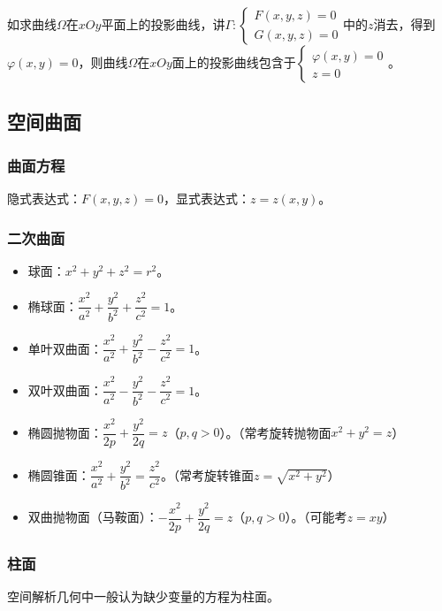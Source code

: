 \documentclass[UTF8, 12pt]{ctexart}
\begin{document}
如求曲线$\varOmega$在$xOy$平面上的投影曲线，讲$\varGamma:\left\{\begin{array}{l}
    F(x,y,z)=0 \\
        G(x,y,z)=0
\end{array}\right.$中的$z$消去，得到$\varphi(x,y)=0$，则曲线$\varOmega$在$xOy$面上的投影曲线包含于$\left\{\begin{array}{l}
    \varphi(x,y)=0 \\
    z=0
\end{array}\right.$。

\subsection{空间曲面}

\subsubsection{曲面方程}

隐式表达式：$F(x,y,z)=0$，显式表达式：$z=z(x,y)$。

\subsubsection{二次曲面}

\begin{itemize}
    \item 球面：$x^2+y^2+z^2=r^2$。
    \item 椭球面：$\dfrac{x^2}{a^2}+\dfrac{y^2}{b^2}+\dfrac{z^2}{c^2}=1$。
    \item 单叶双曲面：$\dfrac{x^2}{a^2}+\dfrac{y^2}{b^2}-\dfrac{z^2}{c^2}=1$。
    \item 双叶双曲面：$\dfrac{x^2}{a^2}-\dfrac{y^2}{b^2}-\dfrac{z^2}{c^2}=1$。
    \item 椭圆抛物面：$\dfrac{x^2}{2p}+\dfrac{y^2}{2q}=z$（$p,q>0$）。（常考旋转抛物面$x^2+y^2=z$）
    \item 椭圆锥面：$\dfrac{x^2}{a^2}+\dfrac{y^2}{b^2}=\dfrac{z^2}{c^2}$。（常考旋转锥面$z=\sqrt{x^2+y^2}$）
    \item 双曲抛物面（马鞍面）：$-\dfrac{x^2}{2p}+\dfrac{y^2}{2q}=z$（$p,q>0$）。（可能考$z=xy$）
\end{itemize}

\subsubsection{柱面}

空间解析几何中一般认为缺少变量的方程为柱面。
\end{document}

